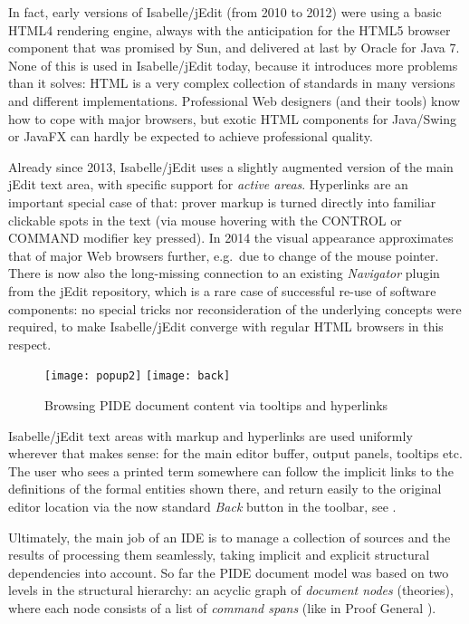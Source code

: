 \begin{isabellebody}
\begin{isamarkuptext}
In fact, early versions of Isabelle/jEdit (from 2010 to 2012) were using a
basic HTML4 rendering engine, always with the anticipation for the HTML5
browser component that was promised by Sun, and delivered at last by Oracle
for Java 7. None of this is used in Isabelle/jEdit today, because it
introduces more problems than it solves: HTML is a very complex collection
of standards in many versions and different implementations. Professional
Web designers (and their tools) know how to cope with major browsers, but
exotic HTML components for Java/Swing or JavaFX can hardly be expected to
achieve professional quality.

Already since 2013, Isabelle/jEdit uses a slightly augmented version of the
main jEdit text area, with specific support for \emph{active areas}.
Hyperlinks are an important special case of that: prover markup is turned
directly into familiar clickable spots in the text (via mouse hovering with
the CONTROL or COMMAND modifier key pressed). In 2014 the visual appearance
approximates that of major Web browsers further, e.g.\ due to change of the
mouse pointer. There is now also the long-missing connection to an existing
\emph{Navigator} plugin from the jEdit repository, which is a rare case of
successful re-use of software components: no special tricks nor
reconsideration of the underlying concepts were required, to make
Isabelle/jEdit converge with regular HTML browsers in this respect.

\begin{figure}[htb]
\begin{center}
\texttt{[image: popup2]}
\texttt{[image: back]}
\end{center}
\caption{Browsing PIDE document content via tooltips and hyperlinks}
\label{fig:navigation}
\end{figure}

\medskip Isabelle/jEdit text areas with markup and hyperlinks are used
uniformly wherever that makes sense: for the main editor buffer, output
panels, tooltips etc. The user who sees a printed term somewhere can follow
the implicit links to the definitions of the formal entities shown there,
and return easily to the original editor location via the now standard
\emph{Back} button in the toolbar, see .\end{isamarkuptext}\isamarkuptrue {}
\isamarkuptrue \begin{isamarkuptext}Ultimately, the main job of an IDE is to manage a collection of
sources and the results of processing them seamlessly, taking implicit and
explicit structural dependencies into account. So far the PIDE document
model was based on two levels in the structural hierarchy: an acyclic graph
of \emph{document nodes} (theories), where each node consists of a list of
\emph{command spans} (like in Proof General \cite{Aspinall:TACAS:2000}).


\end{isamarkuptext}
\end{isabellebody}
